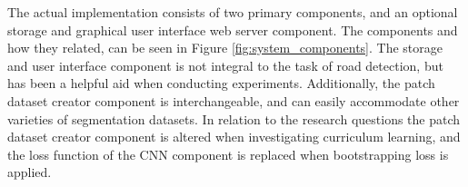 The actual implementation consists of two primary components, and an optional storage and graphical user interface web server component. The components and how they related, can be seen in Figure \ref{fig:system_components}. The storage and user interface component is not integral to the task of road detection, but has been a helpful aid when conducting experiments. Additionally, the patch dataset creator component is interchangeable, and can easily accommodate other varieties of segmentation datasets. In relation to the research questions the patch dataset creator component is altered when investigating curriculum learning, and the loss function of the \ac{CNN} component is replaced when bootstrapping loss is applied. \\


